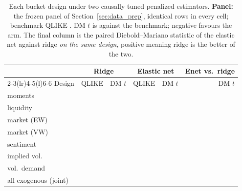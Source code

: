 \begin{table}[H]
\centering
\small
\caption{Each bucket design under two causally tuned penalized
estimators. \textbf{Panel:} the frozen panel of
Section~\ref{sec:data_prep}, identical rows in every cell; benchmark
QLIKE \unifAzeroQLIKE{}. DM $t$ is against the benchmark; negative
favours the arm. The final column is the paired Diebold--Mariano
statistic of the elastic net against ridge \emph{on the same design},
positive meaning ridge is the better of the two.}
\label{tab:buckets_tuned}
\begin{tabular}{@{}lrrrrr@{}}
\toprule
& \multicolumn{2}{c}{Ridge} & \multicolumn{2}{c}{Elastic net} & Enet vs.\ ridge \\
\cmidrule(lr){2-3}\cmidrule(lr){4-5}\cmidrule(l){6-6}
Design & QLIKE & DM $t$ & QLIKE & DM $t$ & DM $t$ \\
\midrule
moments      & \unifBrTunedMomentsQLIKE{}    & \unifBrTunedMomentsDM{}    & \unifBeTunedMomentsQLIKE{}    & \unifBeTunedMomentsDM{}    & \unifIncrBeTunedMomentsDM{} \\
liquidity    & \unifBrTunedLiquidityQLIKE{}  & \unifBrTunedLiquidityDM{}  & \unifBeTunedLiquidityQLIKE{}  & \unifBeTunedLiquidityDM{}  & \unifIncrBeTunedLiquidityDM{} \\
market (EW)  & \unifBrTunedMarketEwQLIKE{}   & \unifBrTunedMarketEwDM{}   & \unifBeTunedMarketEwQLIKE{}   & \unifBeTunedMarketEwDM{}   & \unifIncrBeTunedMarketEwDM{} \\
market (VW)  & \unifBrTunedMarketVwQLIKE{}   & \unifBrTunedMarketVwDM{}   & \unifBeTunedMarketVwQLIKE{}   & \unifBeTunedMarketVwDM{}   & \unifIncrBeTunedMarketVwDM{} \\
sentiment    & \unifBrTunedSentimentQLIKE{}  & \unifBrTunedSentimentDM{}  & \unifBeTunedSentimentQLIKE{}  & \unifBeTunedSentimentDM{}  & \unifIncrBeTunedSentimentDM{} \\
implied vol. & \unifBrTunedImpliedVolQLIKE{} & \unifBrTunedImpliedVolDM{} & \unifBeTunedImpliedVolQLIKE{} & \unifBeTunedImpliedVolDM{} & \unifIncrBeTunedImpliedVolDM{} \\
vol.\ demand & \unifBrTunedVolDemandQLIKE{}  & \unifBrTunedVolDemandDM{}  & \unifBeTunedVolDemandQLIKE{}  & \unifBeTunedVolDemandDM{}  & \unifIncrBeTunedVolDemandDM{} \\
\midrule
all exogenous (joint) & \unifBrTunedAllFeaturesQLIKE{} & \unifBrTunedAllFeaturesDM{} & \unifBeTunedAllFeaturesQLIKE{} & \unifBeTunedAllFeaturesDM{} & \unifIncrBeTunedAllFeaturesDM{} \\
\bottomrule
\end{tabular}
\end{table}

